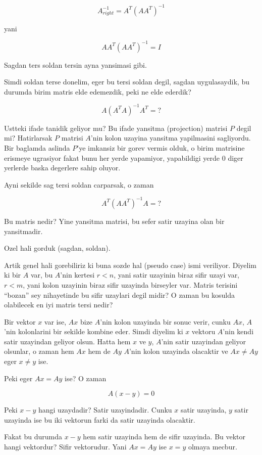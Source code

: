 \documentclass[12pt,fleqn]{article}\usepackage{../common}
\begin{document}
$$ A_{right}^{-1} = A^T(AA^T)^{-1} $$

yani 

$$ A A^T(AA^T)^{-1} = I$$

Sagdan ters soldan tersin ayna yansimasi gibi. 

Simdi soldan terse donelim, eger bu tersi soldan degil, sagdan
uygulasaydik, bu durumda birim matris elde edemezdik, peki ne elde ederdik?


$$ A (A^TA)^{-1} A^T = ?$$

Ustteki ifade tanidik geliyor mu? Bu ifade yansitma (projection) matrisi
$P$ degil mi? Hatirlarsak $P$ matrisi $A$'nin kolon uzayina yansitma
yapilmasini sagliyordu. Bir baglamda aslinda $P$'ye imkansiz bir gorev
vermis olduk, o birim matrisine erismeye ugrasiyor fakat bunu her yerde
yapamiyor, yapabildigi yerde 0 diger yerlerde baska degerlere sahip
oluyor. 

Ayni sekilde sag tersi soldan carparsak, o zaman 

$$ A^T (AA^T)^{-1}A = ?$$

Bu matris nedir? Yine yansitma matrisi, bu sefer satir uzayina olan bir
yansitmadir. 

Ozel hali gorduk (sagdan, soldan). 

Artik genel hali gorebiliriz ki buna sozde hal (pseudo case) ismi
veriliyor. Diyelim ki bir $A$ var, bu $A$'nin kertesi $r < n$, yani satir
uzayinin biraz sifir uzayi var, $r < m$, yani kolon uzayinin biraz sifir
uzayinda birseyler var. Matris terisini ``bozan'' sey nihayetinde bu sifir
uzaylari degil midir? O zaman bu kosulda olabilecek en iyi matris tersi
nedir?

Bir vektor $x$ var ise, $Ax$ bize $A$'nin kolon uzayinda bir sonuc verir,
cunku $Ax$, $A$'nin kolonlarini bir sekilde kombine eder. Simdi diyelim ki
$x$ vektoru $A$'nin kendi satir uzayindan geliyor olsun. Hatta hem $x$ ve
$y$, $A$'nin satir uzayindan geliyor olsunlar, o zaman hem $Ax$ hem de $Ay$
$A$'nin kolon uzayinda olacaktir ve $Ax \ne Ay$ eger $x \ne y$ ise. 

Peki eger $Ax = Ay$ ise? O zaman 

$$ A(x-y) = 0 $$

Peki $x-y$ hangi uzaydadir? Satir uzayindadir. Cunku $x$ satir uzayinda,
$y$ satir uzayinda ise bu iki vektorun farki da satir uzayinda olacaktir. 

Fakat bu durumda $x-y$ hem satir uzayinda hem de sifir uzayinda. Bu vektor
hangi vektordur? Sifir vektorudur. Yani $Ax = Ay$ ise $x = y$ olmaya
mecbur. 
\end{document}
